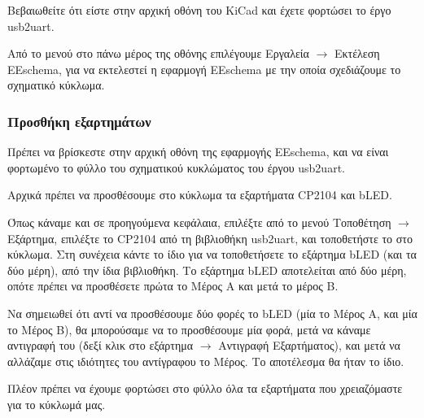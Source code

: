 \documentclass[a4paper]{article}
\begin{document}
Βεβαιωθείτε ότι είστε στην αρχική οθόνη του \textenglish{KiCad} και έχετε φορτώσει το έργο usb2uart.

Από το μενού στο πάνω μέρος της οθόνης επιλέγουμε Εργαλεία $\rightarrow$ Εκτέλεση \textenglish{EEschema}, για να εκτελεστεί η εφαρμογή \textenglish{EEschema} με την οποία σχεδιάζουμε το σχηματικό κύκλωμα. 

\subsubsection{Προσθήκη εξαρτημάτων}

Πρέπει να βρίσκεστε στην αρχική οθόνη της εφαρμογής \textenglish{EEschema}, και να είναι φορτωμένο το φύλλο του σχηματικού κυκλώματος του έργου usb2uart.

\begin{figure}
  \begin{center}
    \label{fig:kicad-main}
  \end{center}
\end{figure}

Αρχικά πρέπει να προσθέσουμε στο κύκλωμα τα εξαρτήματα \textenglish{CP2104} και b\textenglish{LED}. 

Όπως κάναμε και σε προηγούμενα κεφάλαια, επιλέξτε από το μενού Τοποθέτηση $\rightarrow$ Εξάρτημα, επιλέξτε το \textenglish{CP2104} από τη βιβλιοθήκη usb2uart, και τοποθετήστε το στο κύκλωμα. Στη συνέχεια κάντε το ίδιο για να τοποθετήσετε το εξάρτημα b\textenglish{LED} (και τα δύο μέρη), από την ίδια βιβλιοθήκη. Το εξάρτημα b\textenglish{LED} αποτελείται από δύο μέρη, οπότε πρέπει να προσθέσετε πρώτα το Μέρος Α και μετά το μέρος Β.

Να σημειωθεί ότι αντί να προσθέσουμε δύο φορές το b\textenglish{LED} (μία το Μέρος Α, και μία το Μέρος Β), θα μπορούσαμε να το προσθέσουμε μία φορά, μετά να κάναμε αντιγραφή του (δεξί κλικ στο εξάρτημα $\rightarrow$ Αντιγραφή Εξαρτήματος), και μετά να αλλάζαμε στις ιδιότητες του αντίγραφου το Μέρος. Το αποτέλεσμα θα ήταν το ίδιο.

Πλέον πρέπει να έχουμε φορτώσει στο φύλλο όλα τα εξαρτήματα που χρειαζόμαστε για το κύκλωμά μας.

\begin{figure}
  \begin{center}
    \label{fig:kicad-main}
  \end{center}
\end{figure}
\end{document}
